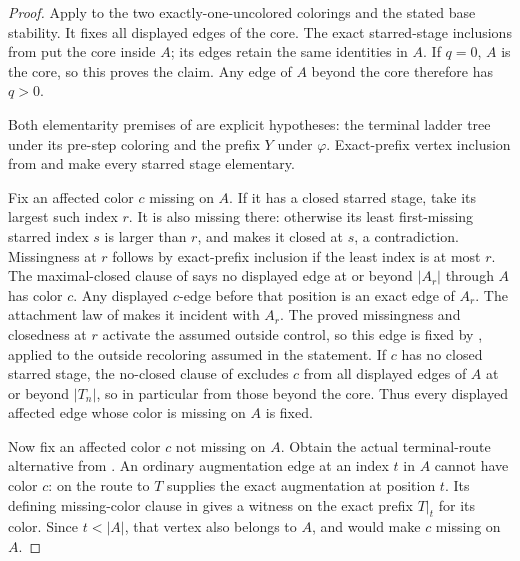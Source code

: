 \begin{proof}
Apply  to the two exactly-one-uncolored
colorings and the stated base stability.  It fixes all displayed edges
of the core.  The exact starred-stage inclusions from
 put the core inside $A$; its edges retain
the same identities in $A$.  If $q=0$, $A$ is the core, so this proves
the claim.  Any edge of $A$ beyond the core therefore has $q>0$.

Both elementarity premises of  are explicit hypotheses:
the terminal ladder tree under its pre-step coloring and the prefix $Y$
under $\varphi$.  Exact-prefix vertex inclusion from
 and
 make every starred stage elementary.

Fix an affected color $c$ missing on $A$.
If it has a closed starred stage, take its largest such index $r$.
It is also missing there: otherwise its least first-missing starred
index $s$ is larger than $r$, and
 makes it closed at $s$, a
contradiction.  Missingness at $r$ follows by exact-prefix inclusion if
the least index is at most $r$.  The maximal-closed clause of
 says no displayed edge at or beyond $|A_r|$ through $A$
has color $c$.  Any displayed $c$-edge before that position is an exact
edge of $A_r$.  The attachment law of  makes it
incident with $A_r$.  The proved missingness and closedness at $r$
activate the assumed outside control, so this edge is fixed by
, applied to the outside recoloring
assumed in the statement.
If $c$ has no closed starred stage, the no-closed clause of
 excludes $c$ from all displayed edges of $A$ at or
beyond $|T_n|$, so in particular from those beyond the core.
Thus every displayed affected edge whose color is missing on $A$
is fixed.

Now fix an affected color $c$ not missing on $A$.  Obtain the actual
terminal-route alternative from .
An ordinary augmentation edge at an index $t$ in $A$ cannot have color
$c$:  on the route to
$T$ supplies the exact augmentation at position $t$.  Its defining
missing-color clause in  gives a witness
on the exact prefix $T|_t$ for its color.
Since $t<|A|$, that vertex also belongs to $A$, and
 would make $c$ missing on $A$.


\end{proof}

